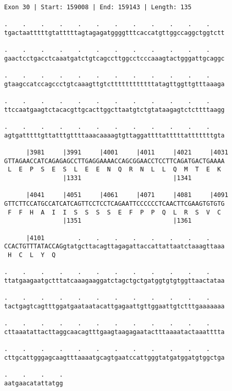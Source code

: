 \documentclass{article}
\begin{document}
\begin{Verbatim}
Exon 30 | Start: 159008 | End: 159143 | Length: 135
 
.    .    .    .    .    .    .    .    .    .    .    .    
tgactaatttttgtatttttagtagagatggggtttcaccatgttggccaggctggtctt
  
.    .    .    .    .    .    .    .    .    .    .    .    
gaactcctgacctcaaatgatctgtcagccttggcctcccaaagtactgggattgcaggc
  
.    .    .    .    .    .    .    .    .    .    .    .    
gtaagccatccagccctgtcaaagttgtcttttttttttttatagttggttgtttaaaga
  
.    .    .    .    .    .    .    .    .    .    .    .    
ttccaatgaagtctacacgttgcacttggcttaatgtctgtataagagtctcttttaagg
  
.    .    .    .    .    .    .    .    .    .    .    .    
agtgatttttgttatttgttttaaacaaaagtgttaggattttatttttatttttttgta
  
      |3981     |3991     |4001     |4011     |4021     |4031
GTTAGAACCATCAGAGAGCCTTGAGGAAAACCAGCGGAACCTCCTTCAGATGACTGAAAA
 L  E  P  S  E  S  L  E  E  N  Q  R  N  L  L  Q  M  T  E  K 
                |1331                         |1341         
  
      |4041     |4051     |4061     |4071     |4081     |4091
GTTCTTCCATGCCATCATCAGTTCCTCCTCAGAATTCCCCCCTCAACTTCGAAGTGTGTG
 F  F  H  A  I  I  S  S  S  S  E  F  P  P  Q  L  R  S  V  C 
                |1351                         |1361         
  
      |4101         .    .    .    .    .    .    .    .    
CCACTGTTTATACCAGgtatgcttacagttagagattaccattattaatctaaagttaaa
 H  C  L  Y  Q                                              
  
.    .    .    .    .    .    .    .    .    .    .    .    
ttatgaagaatgctttatcaaagaaggatctagctgctgatggtgtgtggttaactataa
  
.    .    .    .    .    .    .    .    .    .    .    .    
tactgagtcagtttggatgaataatacattgagaattgttggaattgtctttgaaaaaaa
  
.    .    .    .    .    .    .    .    .    .    .    .    
cttaaatattacttaggcaacagtttgaagtaagagaatactttaaaatactaaatttta
  
.    .    .    .    .    .    .    .    .    .    .    .    
cttgcattgggagcaagtttaaaatgcagtgaatccattgggtatgatggatgtggctga
  
.    .    .    .
aatgaacatattatgg
\end{Verbatim}
\newpage
\end{document}
